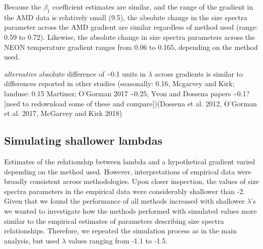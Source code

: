 \documentclass[
]{article}
\begin{document}
Because the \(\beta_1\) coefficient estimates are similar, and the range
of the gradient in the AMD data is relatively small (9.5), the absolute
change in the size spectra parameter across the AMD gradient are similar
regardless of method used (range: 0.59 to 0.72). Likewise, the absolute
change in size spectra parameters across the NEON temperature gradient
ranges from 0.06 to 0.165, depending on the method used.

\emph{alternative} absolute difference of \textasciitilde0.1 units in
\(\lambda\) across gradients is similar to differences reported in other
studies (seasonally: 0.16, Mcgarvey and Kirk; landuse: 0.15 Martinez;
O'Gorman 2017 \textasciitilde0.25, Yvon and Dossena papers
\textasciitilde0.1? {[}need to redownload some of these and
compare{]})(Dossena et al. 2012, O'Gorman et al. 2017, McGarvey and Kirk
2018)

\hypertarget{simulating-shallower-lambdas}{%
\subsection{Simulating shallower
lambdas}\label{simulating-shallower-lambdas}}

Estimates of the relationship between lambda and a hypothetical gradient
varied depending on the method used. However, interpretations of
empirical data were broadly consistent across methodologies. Upon closer
inspection, the values of size spectra parameters in the empirical data
were considerably shallower than -2. Given that we found the performance
of all methods increased with shallower \(\lambda\)'s we wanted to
investigate how the methods performed with simulated values more similar
to the empirical estimates of parameters describing size spectra
relationships. Therefore, we repeated the simulation process as in the
main analysis, but used \(\lambda\) values ranging from -1.1 to -1.5.
\end{document}
